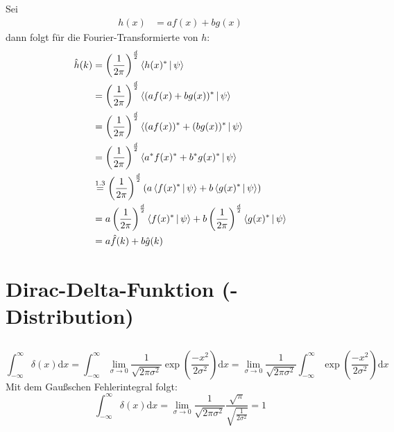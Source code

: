 \documentclass[a4paper,11pt]{article}
\begin{document}
\subsection{}
\subsubsection{}

Sei
\begin{align}
    h(x) &= af(x) + bg(x)
\end{align}
dann folgt für die Fourier-Transformierte von $h$:
\begin{align}
\begin{split}
    \hat{h}(k) &= \left(\frac{1}{2\pi} \right)^{\frac{d}{2}} \Braket{ h(x)^* | \psi} \\
               &= \left(\frac{1}{2\pi} \right)^{\frac{d}{2}} \Braket{ (af(x)+bg(x))^* | \psi} \\
               &= \left(\frac{1}{2\pi} \right)^{\frac{d}{2}} \Braket{ (af(x))^*+(bg(x))^* | \psi} \\
               &= \left(\frac{1}{2\pi} \right)^{\frac{d}{2}} \Braket{ a^*f(x)^*+b^*g(x)^* | \psi} \\
               &\overset{1.3}{=} \left(\frac{1}{2\pi} \right)^{\frac{d}{2}} \left( a \Braket{ f(x)^* | \psi} + b \Braket{ g(x)^* | \psi} \right) \\
               &= a \left(\frac{1}{2\pi} \right)^{\frac{d}{2}} \Braket{ f(x)^* | \psi} + b \left(\frac{1}{2\pi} \right)^{\frac{d}{2}} \Braket{ g(x)^* | \psi} \\
               &= a\hat{f}(k) + b\hat{g}(k)
\end{split}
\end{align}
\section{Dirac-Delta-Funktion (-Distribution)}

\subsection{}
\begin{equation}
        \int_{-\infty}^\infty \delta(x) \text{d}x = \int_{-\infty}^\infty \lim_{\sigma \to 0}\frac{1}{\sqrt{2\pi\sigma^2}}\exp(\frac{-x^2}{2\sigma^2})\text{d}x = \lim_{\sigma \to 0}\frac{1}{\sqrt{2\pi\sigma^2}} \int_{-\infty}^\infty \exp(\frac{-x^2}{2\sigma^2})\text{d}x
\end{equation}
Mit dem Gaußschen Fehlerintegral folgt:
\begin{equation}
        \int_{-\infty}^\infty \delta(x) \text{d}x = \lim_{\sigma \to 0}\frac{1}{\sqrt{2\pi\sigma^2}} \frac{\sqrt{\pi}}{\sqrt{\frac{1}{2\sigma^2}}} = 1
\end{equation}
\end{document}
